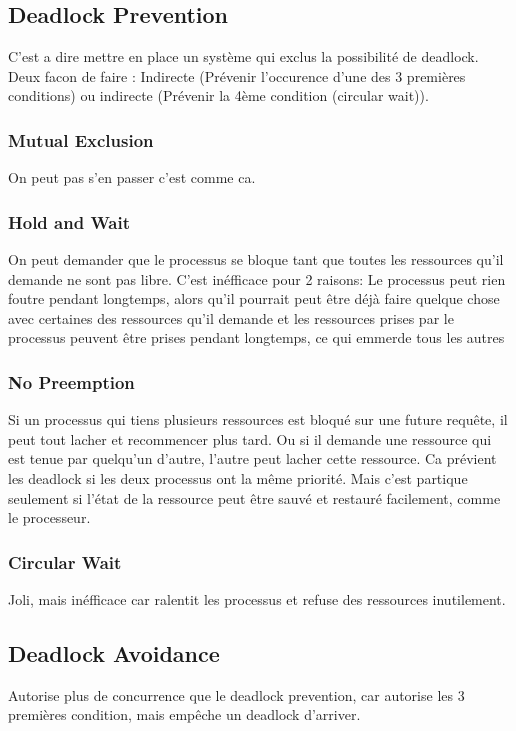 \subsection{Deadlock Prevention}
C'est a dire mettre en place un système qui exclus la possibilité de deadlock.
Deux facon de faire : Indirecte (Prévenir l'occurence d'une des 3 premières conditions) ou indirecte (Prévenir la 4ème condition (circular wait)).

\subsubsection{Mutual Exclusion}
On peut pas s'en passer c'est comme ca.

\subsubsection{Hold and Wait}
On peut demander que le processus se bloque tant que toutes les ressources qu'il demande ne sont pas libre.
C'est inéfficace pour 2 raisons:
Le processus peut rien foutre pendant longtemps,
alors qu'il pourrait peut être déjà faire quelque chose avec certaines des ressources qu'il demande et les ressources prises
par le processus peuvent être prises pendant longtemps, ce qui emmerde tous les autres

\subsubsection{No Preemption}
Si un processus qui tiens plusieurs ressources est bloqué sur une future requête, il peut tout lacher et recommencer plus tard.
Ou si il demande une ressource qui est tenue par quelqu'un d'autre, l'autre peut lacher cette ressource.
Ca prévient les deadlock si les deux processus ont la même priorité.
Mais c'est partique seulement si l'état de la ressource peut être sauvé et restauré facilement, comme le processeur.

\subsubsection{Circular Wait}
Joli, mais inéfficace car ralentit les processus et refuse des ressources inutilement.

\subsection{Deadlock Avoidance}
Autorise plus de concurrence que le deadlock prevention, car autorise les 3 premières condition, mais empêche un deadlock d'arriver.

